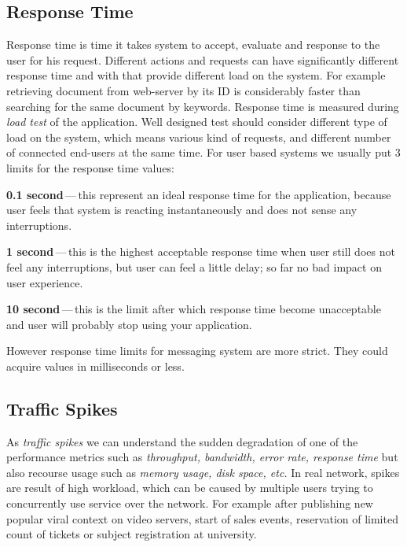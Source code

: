 \subsection*{Response Time}
\label{Response Time 1}
Response time is time it takes system to accept, evaluate and response to the user for his request. Different actions and requests can have significantly different response time and with that provide different load on the system. For example retrieving document from web-server by its ID is considerably faster than searching for the same document by keywords. Response time is measured during \emph{load test} \cite{Manzor:APTB} of the application. Well designed test should consider different type of load on the system, which means various kind of requests, and different number of connected end-users at the same time. For user based systems we usually put 3 limits for the response time values: 

\begin{description}
	\setlength\itemsep{0em}
	\item \textbf{0.1 second}\,---\,this represent an ideal response time for the application, because user feels that system is reacting instantaneously and does not sense any interruptions.
	\item \textbf{1 second}\,---\,this is the highest acceptable response time when user still does not feel any interruptions, but user can feel a little delay; so far no bad impact on user experience.
	\item \textbf{10 second}\,---\,this is the limit after which response time become unacceptable and user will probably stop using your application.
\end{description}

However response time limits for messaging system are more strict. They could acquire values in milliseconds or less.


\subsection*{Traffic Spikes}
As \emph{traffic spikes} \cite{Kurkova:Thesis:2017, AMC:SPIKES} we can understand the sudden degradation of one of the performance metrics such as \emph{throughput, bandwidth, error rate, response time} but also recourse usage such as \emph{memory usage, disk space, etc.} In real network, spikes are result of high workload, which can be caused by multiple users trying to concurrently use service over the network. For example after publishing new popular viral context on video servers, start of sales events, reservation of limited count of tickets or subject registration at university.

